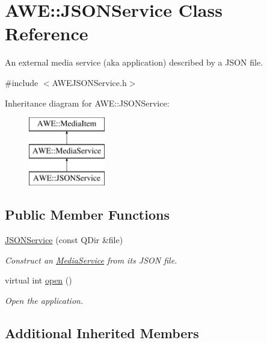 \hypertarget{class_a_w_e_1_1_j_s_o_n_service}{\section{A\-W\-E\-:\-:J\-S\-O\-N\-Service Class Reference}
\label{class_a_w_e_1_1_j_s_o_n_service}
}


An external media service (aka application) described by a J\-S\-O\-N file.  




{\ttfamily \#include $<$A\-W\-E\-J\-S\-O\-N\-Service.\-h$>$}

Inheritance diagram for A\-W\-E\-:\-:J\-S\-O\-N\-Service\-:\begin{figure}[H]
\begin{center}
\leavevmode
\includegraphics[height=3.000000cm]{class_a_w_e_1_1_j_s_o_n_service}
\end{center}
\end{figure}
\subsection*{Public Member Functions}
\begin{DoxyCompactItemize}
\item 
\hyperlink{class_a_w_e_1_1_j_s_o_n_service_a58c3b9fa5381f96db275cc3231dc4f83}{J\-S\-O\-N\-Service} (const Q\-Dir \&file)
\begin{DoxyCompactList}\small\item\em Construct an \hyperlink{class_a_w_e_1_1_media_service}{Media\-Service} from its J\-S\-O\-N file. \end{DoxyCompactList}\item 
virtual int \hyperlink{class_a_w_e_1_1_j_s_o_n_service_a19bbb59a75a05ad22d768d73febeeeda}{open} ()
\begin{DoxyCompactList}\small\item\em Open the application. \end{DoxyCompactList}\end{DoxyCompactItemize}
\subsection*{Additional Inherited Members}


